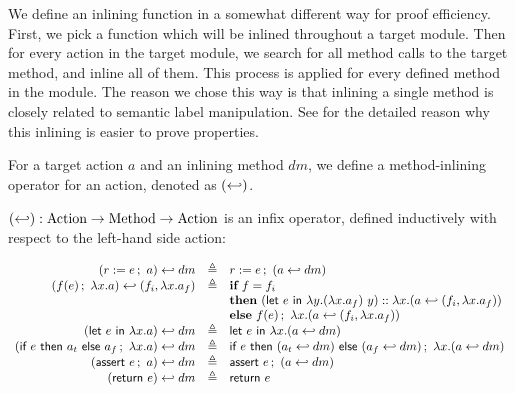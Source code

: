 We define an inlining function in a somewhat different way for proof
efficiency. First, we pick a function which will be inlined throughout
a target module. Then for every action in the target module, we search
for all method calls to the target method, and inline all of
them. This process is applied for every defined method in the
module. The reason we chose this way is that inlining a single method
is closely related to semantic label manipulation. See
 for the detailed reason why this inlining
is easier to prove properties.

For a target action $a$ and an inlining method $dm$, we define a
method-inlining operator for an action, denoted as $(\inlinedmsymb)$.

\begin{definition}
  \label{def-inlinedm}
  $(\inlinedmsymb) : \textrm{Action} \to \textrm{Method} \to
  \textrm{Action}$ is an infix operator, defined inductively with
  respect to the left-hand side action:
  \begin{center}
    \begin{math}
      \begin{array}{rcl}
        \inlinedm{(\actwrite{r}{e}{a})}{dm} & \triangleq &
        \actwrite{r}{e}{(\inlinedm{a}{dm})} \\
        \inlinedm{(\actcall{x}{f}{e}{a})}{(f_i, \lambda x.a_f)} & \triangleq &
        \pgmif{} f = f_i \\
        & & \pgmthen{} \concataction{(\actlet{e}{y}{(\lambda x.a_f)\ y})}{(\inlinedm{a}{(f_i, \lambda x.a_f)})} \\
        & & \pgmelse{} \actcall{x}{f}{e}{(\inlinedm{a}{(f_i, \lambda x.a_f)})} \\
        \inlinedm{(\actlet{e}{x}{a})}{dm} & \triangleq &
        \actlet{e}{x}{(\inlinedm{a}{dm})} \\
        \inlinedm{(\actifelse{e}{a_t}{a_f}{x}{a})}{dm} & \triangleq &
        \actifelse{e}{(\inlinedm{a_t}{dm})}{(\inlinedm{a_f}{dm})}{x}{(\inlinedm{a}{dm})} \\
        \inlinedm{(\actassert{e}{a})}{dm} & \triangleq &
        \actassert{e}{(\inlinedm{a}{dm})} \\
        \inlinedm{(\actret{e})}{dm} & \triangleq & \actret{e} \\
      \end{array}
    \end{math}
  \end{center}
\end{definition}

